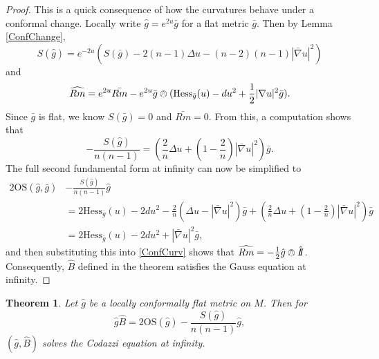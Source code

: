 \documentclass{amsart}
\newcommand{\two}{I\!\!I}
\newtheorem{thm}{Theorem}[section]
\numberwithin{equation}{section}
\begin{document}
\begin{proof}
This is a quick consequence of how the curvatures behave under a conformal change.
Locally write $\hat{g} = e^{2u}\bar{g}$ for a flat metric $\bar{g}$. Then by Lemma \ref{ConfChange},
\[
S(\hat{g}) = e^{-2u}(S(\bar{g}) -2(n-1)\Delta u  - (n-2)(n-1)|\bar{\nabla}u|^2)
\]
and
\begin{equation}
\label{ConfCurv}
\widehat{Rm} = e^{2u}\bar{Rm} - e^{2u}\bar{g}\owedge(\mathrm{Hess}_{\bar{g}}(u) - du^2 + \frac{1}{2}|\nabla u|^2\bar{g}).
\end{equation}
Since $\bar{g}$ is flat, we know $S(\bar{g}) = 0$ and $\bar{Rm} = 0$.
From this, a computation shows that
\[
-\frac{S(\hat{g})}{n(n-1)} = \left( \frac{2}{n}\Delta u + \left(1 - \frac{2}{n}\right)|\bar{\nabla}u|^2 \right)\bar{g}.
\]
The full second fundamental form at infinity can now be simplified to 
\begin{align}
2\mathrm{OS}(\hat{g},\bar{g}) &- \frac{S(\hat{g})}{n(n-1)}\hat{g} \nonumber \\
&= 2\mathrm{Hess}_{\bar{g}}(u) - 2du^2 - \frac{2}{n}\left(\Delta u - |\bar{\nabla}u|^2\right)\bar{g} + \left( \frac{2}{n}\Delta u + \left(1 - \frac{2}{n}\right)|\bar{\nabla}u|^2 \right)\bar{g} \nonumber \\
&= 2\mathrm{Hess}_{\bar{g}}(u) - 2 du^2 + |\bar{\nabla}u|^2 \bar{g}, \label{OSu}
\end{align}
and then substituting this into \eqref{ConfCurv} shows that $\widehat{Rm} = -\frac{1}{2}\hat{g}\owedge \hat{\two}$.
Consequently, $\hat{B}$ defined in the theorem satisfies the Gauss equation at infinity.
\end{proof}

\begin{thm}
\label{MainThmCodazzi}
Let $\hat{g}$ be a locally conformally flat metric on $M$. Then for 
\[
\hat{g} \hat{B} = 2\mathrm{OS}(\hat{g}) - \frac{S(\hat{g})}{n(n-1)}\hat{g},
\]
$(\hat{g},\hat{B})$ solves the Codazzi equation at infinity.
\end{thm}
\end{document}
